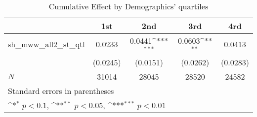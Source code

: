 \begin{table}[htbp]\centering
\def\sym#1{\ifmmode^{#1}\else\(^{#1}\)\fi}
\caption{Cumulative Effect by Demographics' quartiles}
\begin{tabular}{l*{4}{c}}
\hline\hline
            &\multicolumn{1}{c}{1st}&\multicolumn{1}{c}{2nd}&\multicolumn{1}{c}{3rd}&\multicolumn{1}{c}{4rd}\\
\hline
sh\_mww\_all2\_st\_qtl&      0.0233         &      0.0441\sym{***}&      0.0603\sym{**} &      0.0413         \\
            &    (0.0245)         &    (0.0151)         &    (0.0262)         &    (0.0283)         \\
\hline
\(N\)       &       31014         &       28045         &       28520         &       24582         \\
\hline\hline
\multicolumn{5}{l}{\footnotesize Standard errors in parentheses}\\
\multicolumn{5}{l}{\footnotesize \sym{*} \(p<0.1\), \sym{**} \(p<0.05\), \sym{***} \(p<0.01\)}\\
\end{tabular}
\end{table}
